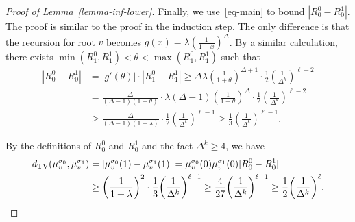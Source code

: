 \documentclass[10pt,a4paper]{article}
\newcommand{\tp}[1]{{\left( #1 \right)}}
\newcommand{\abs}[1]{\ensuremath{\left\vert#1\right\vert}}
\newcommand{\dTV}{d_{\mathrm{TV}}}
\begin{document}
\begin{proof}[Proof of Lemma~\ref{lemma-inf-lower}]
Finally, we use~\eqref{eq-main} to bound $|R^0_0 - R^1_0|$. 
The proof is similar to the proof in the induction step.
The only difference is that the recursion for root $v$ becomes $g(x) = \lambda \tp{\frac{1}{1+x}}^{\Delta}$. By a similar calculation, there exists $\min(R^0_{1}, R^1_{1}) < \theta < \max(R^0_{1}, R^1_{1}) $ such that 
\begin{align*}
|R^0_0 - R^1_0| &= |g'(\theta)| \cdot  \abs{R^0_{1} - R^1_{1}}  \geq  \Delta \lambda \tp{\frac{1}{1+\theta}}^{\Delta+1} \cdot 	\frac{1}{2}\tp{\frac{1}{\Delta^k}}^{\ell-2}\\
&= \frac{\Delta}{(\Delta - 1)(1+\theta)} \cdot \lambda (\Delta-1) \tp{\frac{1}{1+\theta}}^{\Delta}  \cdot \frac{1}{2}\tp{\frac{1}{\Delta^k}}^{\ell-2}\\
&\geq  \frac{\Delta}{(\Delta - 1)(1+\lambda)} \cdot \frac{1}{2}\tp{\frac{1}{\Delta^k}}^{\ell-1}
 \geq \frac{1}{3}\tp{\frac{1}{\Delta^k}}^{\ell-1}.
\end{align*}

By the definitions of $R^0_0$ and $R^1_0$ and the fact $\Delta^k \geq 4$, we have
\begin{align*}
	\dTV\tp{ \mu^{\sigma_0}_v, \mu^{\sigma_1}_v } &= \abs{\mu^{\sigma_0}_v(1) - \mu^{\sigma_1}_v(1)} = \mu^{\sigma_0}_v(0)\mu^{\sigma_1}_v(0) |R^0_0 - R^1_0|\\
	&\geq \tp{\frac{1}{1+\lambda}}^2 \cdot \frac{1}{3}\tp{\frac{1}{\Delta^k}}^{\ell-1} 
  \geq \frac{4}{27}\tp{\frac{1}{\Delta^k}}^{\ell-1}
	\geq \frac{1}{2}\tp{\frac{1}{\Delta^k}}^{\ell}. \qedhere
\end{align*}
\end{proof}
\end{document}
